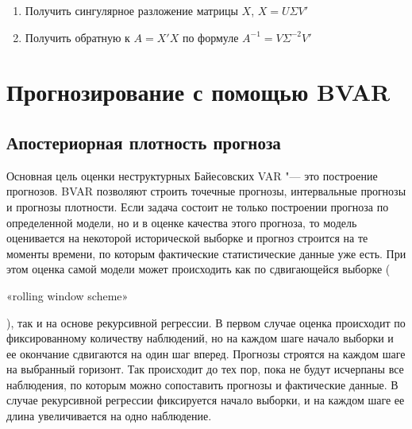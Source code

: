 \documentclass[11pt]{article} %
\newcommand{\eng}[1]{\begin{otherlanguage}{english}#1\end{otherlanguage}}
\begin{document}
\begin{enumerate}
\item Получить сингулярное разложение матрицы $X$, $X=U\Sigma V'$
\item Получить обратную к $A=X'X$ по формуле $A^{-1}=V\Sigma^{-2} V'$
\end{enumerate}


%
%
\section{Прогнозирование с помощью BVAR}

\subsection{Апостериорная плотность прогноза}
Основная цель оценки неструктурных Байесовских VAR "--- это построение прогнозов. BVAR позволяют строить точечные прогнозы, интервальные прогнозы и  прогнозы  плотности. Если задача состоит не только построении прогноза по определенной модели, но и в оценке качества этого прогноза, то модель оценивается на некоторой исторической выборке и прогноз строится на те моменты времени, по которым фактические статистические данные уже есть. При этом оценка самой модели может происходить как по сдвигающейся выборке (\eng{«rolling window scheme»}), так и на основе рекурсивной регрессии. В первом случае оценка происходит по фиксированному количеству наблюдений, но на каждом шаге начало выборки и ее окончание сдвигаются на один шаг вперед. Прогнозы строятся на каждом шаге на выбранный горизонт.  Так происходит до тех пор, пока не будут исчерпаны все наблюдения, по которым можно сопоставить прогнозы и фактические данные. В случае рекурсивной регрессии фиксируется начало выборки, и на каждом шаге ее длина увеличивается на одно наблюдение.
\end{document}
